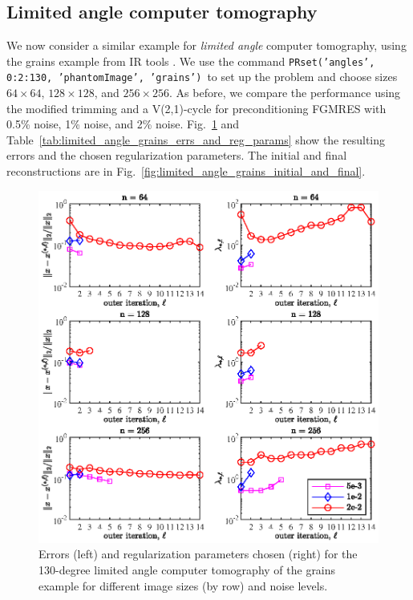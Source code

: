 \subsection{Limited angle computer tomography}
We now consider a similar example for \textit{limited angle} computer tomography, using the grains example from IR tools \cite{art:GAZZ19}. We use the command \texttt{PRset('angles', 0:2:130, 'phantomImage', 'grains')} to set up the problem and choose sizes $64 \times 64$, $128 \times 128$, and $256 \times 256$. As before, we compare the performance using the modified trimming and a V(2,1)-cycle for preconditioning FGMRES with 0.5\% noise, 1\% noise, and 2\% noise. Fig.~\ref{fig:limited_angle_grains_errs_and_reg_params} and Table~\ref{tab:limited_angle_grains_errs_and_reg_params} show the resulting errors and the chosen regularization parameters. The initial and final reconstructions are in Fig.~\ref{fig:limited_angle_grains_initial_and_final}.
\begin{figure}[htbp]
\begin{center}
\includegraphics{figures/limited_angle_errs_and_reg_params}
\caption{Errors (left) and regularization parameters chosen (right) for the 130-degree limited angle computer tomography of the grains example for different image sizes (by row) and noise levels.}
\label{fig:limited_angle_grains_errs_and_reg_params}
\end{center}
\end{figure}
